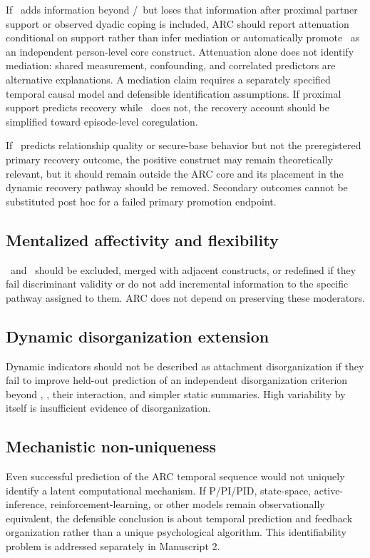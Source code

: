 If \Sec\ adds information beyond \Anx/\Avo\ but loses that information after proximal partner support or observed dyadic coping is included, ARC should report attenuation conditional on support rather than infer mediation or automatically promote \Sec\ as an independent person-level core construct. Attenuation alone does not identify mediation: shared measurement, confounding, and correlated predictors are alternative explanations. A mediation claim requires a separately specified temporal causal model and defensible identification assumptions. If proximal support predicts recovery while \Sec\ does not, the recovery account should be simplified toward episode-level coregulation.

If \Sec\ predicts relationship quality or secure-base behavior but not the preregistered primary recovery outcome, the positive construct may remain theoretically relevant, but it should remain outside the ARC core and its placement in the dynamic recovery pathway should be removed. Secondary outcomes cannot be substituted post hoc for a failed primary promotion endpoint.

\subsection{Mentalized affectivity and flexibility}

\MentAff\ and \Flex\ should be excluded, merged with adjacent constructs, or redefined if they fail discriminant validity or do not add incremental information to the specific pathway assigned to them. ARC does not depend on preserving these moderators.

\subsection{Dynamic disorganization extension}

Dynamic indicators should not be described as attachment disorganization if they fail to improve held-out prediction of an independent disorganization criterion beyond \Anx, \Avo, their interaction, and simpler static summaries. High variability by itself is insufficient evidence of disorganization.

\subsection{Mechanistic non-uniqueness}

Even successful prediction of the ARC temporal sequence would not uniquely identify a latent computational mechanism. If P/PI/PID, state-space, active-inference, reinforcement-learning, or other models remain observationally equivalent, the defensible conclusion is about temporal prediction and feedback organization rather than a unique psychological algorithm. This identifiability problem is addressed separately in Manuscript 2.

